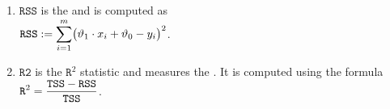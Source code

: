 \begin{enumerate}
      \hspace*{1.3cm}
      $\ds\mathtt{TSS} = \sum\limits_{i=1}^m \bigl(y_i - \bar{\mathbf{y}}\bigr)^2$.
\item $\mathtt{RSS}$ is the  and is computed as
      \\[0.2cm]
      \hspace*{1.3cm}
      $\displaystyle\mathtt{RSS} := \sum\limits_{i=1}^m \bigl(\vartheta_1 \cdot x_i + \vartheta_0 - y_i\bigr)^2$.
\item $\mathtt{R2}$ is the $\mathtt{R}^2$ statistic and measures the .
      It is computed using the formula
      \\[0.2cm]
      \hspace*{1.3cm}
      $\displaystyle \mathtt{R}^2 = \frac{\mathtt{TSS} - \mathtt{RSS}}{\mathtt{TSS}}$.
\end{enumerate}


